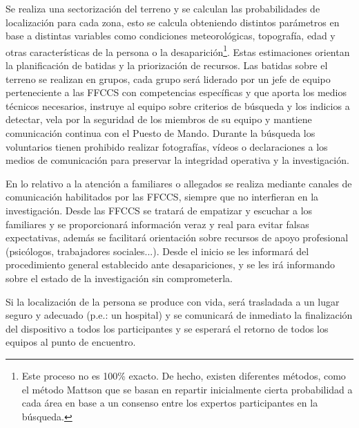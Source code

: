     Se realiza una sectorización del terreno y se calculan las probabilidades de localización para cada zona, esto se calcula obteniendo distintos parámetros en base a distintas variables como condiciones meteorológicas, topografía, edad y otras características de la persona o la desaparición\footnote{Este proceso no es 100\% exacto. De hecho, existen diferentes métodos, como el método Mattson que se basan en repartir inicialmente cierta probabilidad a cada área en base a un consenso entre los expertos participantes en la búsqueda.}. Estas estimaciones orientan la planificación de batidas y la priorización de recursos. Las batidas sobre el terreno se realizan en grupos, cada grupo será liderado por un jefe de equipo perteneciente a las FFCCS con competencias específicas y que aporta los medios técnicos necesarios, instruye al equipo sobre criterios de búsqueda y los indicios a detectar, vela por la seguridad de los miembros de su equipo y mantiene comunicación continua con el Puesto de Mando. Durante la búsqueda los voluntarios tienen prohibido realizar fotografías, vídeos o declaraciones a los medios de comunicación para preservar la integridad operativa y la investigación.
    
    En lo relativo a la atención a familiares o allegados se realiza mediante canales de comunicación habilitados por las FFCCS, siempre que no interfieran en la investigación. Desde las FFCCS se tratará de empatizar y escuchar a los familiares y se proporcionará información veraz y real para evitar falsas expectativas, además se facilitará orientación sobre recursos de apoyo profesional (psicólogos, trabajadores sociales...). Desde el inicio se les informará del procedimiento general establecido ante desapariciones, y se les irá informando sobre el estado de la investigación sin comprometerla.



    Si la localización de la persona se produce con vida, será trasladada a un lugar seguro y adecuado (p.e.: un hospital) y se comunicará de inmediato la finalización del dispositivo a todos los participantes y se esperará el retorno de todos los equipos al punto de encuentro. 

    
